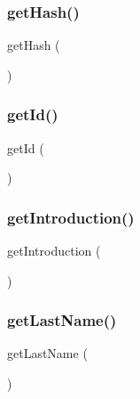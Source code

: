 \mbox{\label{class_app_1_1_entity_1_1_user_a10220afb27800deb78f48b4698a74742}} 
\subsubsection{\texorpdfstring{getHash()}{getHash()}}
{\footnotesize\ttfamily get\+Hash (\begin{DoxyParamCaption}{ }\end{DoxyParamCaption})}

\mbox{\label{class_app_1_1_entity_1_1_user_a12251d0c022e9e21c137a105ff683f13}} 
\subsubsection{\texorpdfstring{getId()}{getId()}}
{\footnotesize\ttfamily get\+Id (\begin{DoxyParamCaption}{ }\end{DoxyParamCaption})}

\mbox{\label{class_app_1_1_entity_1_1_user_a35d5a57a94ec7eac2f80749ad8e256bd}} 
\subsubsection{\texorpdfstring{getIntroduction()}{getIntroduction()}}
{\footnotesize\ttfamily get\+Introduction (\begin{DoxyParamCaption}{ }\end{DoxyParamCaption})}

\mbox{\label{class_app_1_1_entity_1_1_user_a717286a8348a6cf9f6d5fecb04a55fad}} 
\subsubsection{\texorpdfstring{getLastName()}{getLastName()}}
{\footnotesize\ttfamily get\+Last\+Name (\begin{DoxyParamCaption}{ }\end{DoxyParamCaption})}

